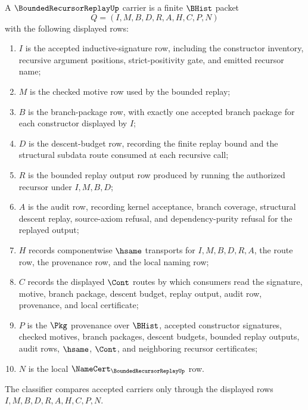 \begin{definition}
\label{def:bounded-recursor-replay-carrier}
A $\BoundedRecursorReplayUp$ carrier is a finite $\BHist$ packet
$$
Q=(I,M,B,D,R,A,H,C,P,N)
$$
with the following displayed rows:
\begin{enumerate}
\item $I$ is the accepted inductive-signature row, including the constructor inventory, recursive argument positions, strict-positivity gate, and emitted recursor name;
\item $M$ is the checked motive row used by the bounded replay;
\item $B$ is the branch-package row, with exactly one accepted branch package for each constructor displayed by $I$;
\item $D$ is the descent-budget row, recording the finite replay bound and the structural subdata route consumed at each recursive call;
\item $R$ is the bounded replay output row produced by running the authorized recursor under $I,M,B,D$;
\item $A$ is the audit row, recording kernel acceptance, branch coverage, structural descent replay, source-axiom refusal, and dependency-purity refusal for the replayed output;
\item $H$ records componentwise $\hsame$ transports for $I,M,B,D,R,A$, the route row, the provenance row, and the local naming row;
\item $C$ records the displayed $\Cont$ routes by which consumers read the signature, motive, branch package, descent budget, replay output, audit row, provenance, and local certificate;
\item $P$ is the $\Pkg$ provenance over $\BHist$, accepted constructor signatures, checked motives, branch packages, descent budgets, bounded replay outputs, audit rows, $\hsame$, $\Cont$, and neighboring recursor certificates;
\item $N$ is the local $\NameCert_{\BoundedRecursorReplayUp}$ row.
\end{enumerate}
The classifier compares accepted carriers only through the displayed rows $I,M,B,D,R,A,H,C,P,N$.
\end{definition}

